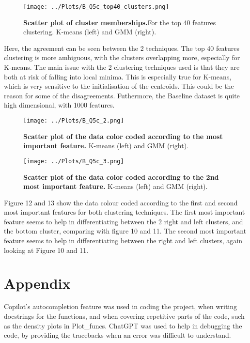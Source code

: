 \documentclass[12pt]{report} %
\begin{document}
\begin{figure}[htbp]
    \centering
    \texttt{[image: ../Plots/B\_Q5c\_top40\_clusters.png]}
    \caption{\textbf{Scatter plot of cluster memberships.}For the top 40 features clustering. K-means (left) and GMM (right).}
\end{figure}

Here, the agreement can be seen between the 2 techniques. The top 40 features clustering is more ambiguous, with the clusters overlapping more, especially for K-means. The main issue with the 2 clustering techniques used is that they are both at risk of falling into local minima. This is especially true for K-means, which is very sensitive to the initialisation of the centroids\cite[p. 263]{sklearn_book}. This could be the reason for some of the disagreements. Futhermore, the Baseline dataset is quite high dimensional, with 1000 features.  

\begin{figure}[htbp]
    \centering
    \texttt{[image: ../Plots/B\_Q5c\_2.png]}
    \caption{\textbf{Scatter plot of the data color coded according to the most important feature.} K-means (left) and GMM (right).}
\end{figure}


\begin{figure}[htbp]
    \centering
    \texttt{[image: ../Plots/B\_Q5c\_3.png]}
    \caption{\textbf{Scatter plot of the data color coded according to the 2nd most important feature.} K-means (left) and GMM (right).}
\end{figure}

Figure 12 and 13 show the data colour coded according to the first and second most important features for both clustering techniques. The first most important feature seems to help in differentiating between the 2 right and left clusters, and the bottom cluster, comparing with figure 10 and 11. The second most important feature seems to help in differentiating between the right and left clusters, again looking at Figure 10 and 11.

\chapter*{Appendix}

Copilot's autocompletion feature was used in coding the project, when writing docstrings for the functions, and when covering repetitive parts of the code, such as the density plots in Plot\_funcs.
ChatGPT was used to help in debugging the code, by providing the tracebacks when an error was difficult to understand.



\end{document}
